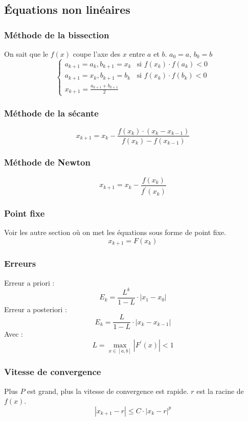 \subsection*{Équations non linéaires}
\noindent
\subsubsection*{Méthode de la bissection}
\noindent
On sait que le $f(x)$ coupe l'axe des $x$ entre $a$ et $b$. $a_0 = a$, $b_0 = b$
\begin{equation}
    \begin{cases}
        a_{k+1} = a_k, b_{k+1} = x_k & \text{si } f(x_k)\cdot f(a_k) < 0 \\
        a_{k+1} = x_k, b_{k+1} = b_k & \text{si } f(x_k)\cdot f(b_k) < 0 \\
        x_{k+1} = \frac{a_{k+1}+b_{k+1}}{2}
    \end{cases}
    \nonumber
\end{equation}
\subsubsection*{Méthode de la sécante}
\noindent
\begin{equation}
    x_{k+1} = x_k - \frac{f(x_k)\cdot (x_k-x_{k-1})}{f(x_k)-f(x_{k-1})}
    \nonumber
\end{equation}
\subsubsection*{Méthode de Newton}
\noindent
\begin{equation}
    x_{k+1} = x_k - \frac{f(x_k)}{f^{\prime}(x_k)}
    \nonumber
\end{equation}
\subsubsection*{Point fixe}
\noindent
Voir les autre section où on met les équations sous forme de point fixe.
\begin{equation}
    x_{k+1} = F(x_k)
    \nonumber
\end{equation}
\subsubsection*{Erreurs}
\noindent
Erreur a priori :
\begin{equation}
    E_k = \frac{L^k}{1-L}\cdot |x_1-x_0|
    \nonumber
\end{equation}
Erreur a posteriori :
\begin{equation}
    E_k = \frac{L}{1-L}\cdot |x_k-x_{k-1}|
    \nonumber
\end{equation}
Avec :
\begin{equation}
    L = \max_{x\in [a,b]}|F^{\prime}(x)| < 1
    \nonumber
\end{equation}
\subsubsection*{Vitesse de convergence}
\noindent
Plus $P$ est grand, plus la vitesse de convergence est rapide.
$r$ est la racine de $f(x)$.
\noindent
\begin{equation}
    |x_{k+1}-r| \leq C\cdot |x_k-r|^p
    \nonumber
\end{equation}

